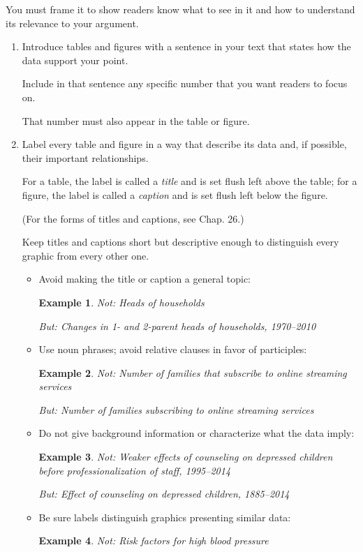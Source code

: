 \documentclass[oneside]{book}
\numberwithin{equation}{section}
\newtheorem{example}{Example}[section]
\begin{document}
You must frame it to show readers know what to see in it and how to understand its relevance to your argument.
\begin{enumerate}
    \item Introduce tables and figures with a sentence in your text that states how the data support your point.
    
    Include in that sentence any specific number that you want readers to focus on.
    
    That number must also appear in the table or figure.
    \item Label every table and figure in a way that describe its data and, if possible, their important relationships.
    
    For a table, the label is called a \textit{title} and is set flush left above the table; for a figure, the label is called a \textit{caption} and is set flush left below the figure.
    
    (For the forms of titles and captions, see Chap. 26.)
    
    Keep titles and captions short but descriptive enough to distinguish every graphic from every other one.
    \begin{itemize}
        \item Avoid making the title or caption a general topic:
        \begin{example}
            Not: Heads of households
            
            But: Changes in 1- and 2-parent heads of households, 1970--2010
        \end{example}
        \item Use noun phrases; avoid relative clauses in favor of participles:
        \begin{example}
            Not: Number of families that subscribe to online streaming services
            
            But: Number of families subscribing to online streaming services
        \end{example}
        \item Do not give background information or characterize what the data imply:
        \begin{example}
            Not: Weaker effects of counseling on depressed children before professionalization of staff, 1995--2014
            
            But: Effect of counseling on depressed children, 1885--2014
        \end{example}
        \item Be sure labels distinguish graphics presenting similar data:
        \begin{example}
            Not: Risk factors for high blood pressure
            

\end{example}
\end{itemize}
\end{enumerate}
\end{document}
